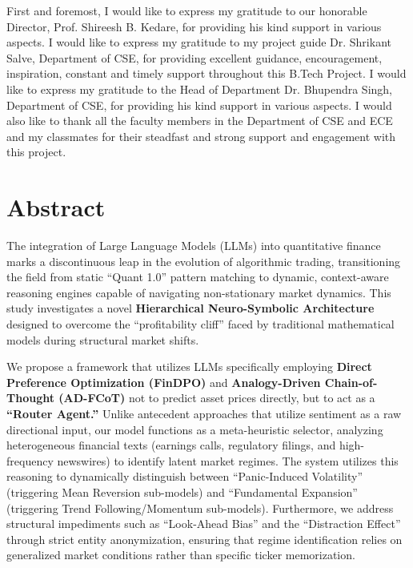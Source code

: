 \documentclass[12pt, a4paper]{report}
\begin{document}
First and foremost, I would like to express my gratitude to our honorable Director, Prof. Shireesh B. Kedare, for providing his kind support in various aspects. I would like to express my gratitude to my project guide Dr. Shrikant Salve, Department of CSE, for providing excellent guidance, encouragement, inspiration, constant and timely support throughout this B.Tech Project. I would like to express my gratitude to the Head of Department Dr. Bhupendra Singh, Department of CSE, for providing his kind support in various aspects. I would also like to thank all the faculty members in the Department of CSE and ECE and my classmates for their steadfast and strong support and engagement with this project.


\newpage
\chapter*{Abstract}

The integration of Large Language Models (LLMs) into quantitative finance marks a discontinuous leap in the evolution of algorithmic trading, transitioning the field from static ``Quant 1.0'' pattern matching to dynamic, context-aware reasoning engines capable of navigating non-stationary market dynamics. This study investigates a novel \textbf{Hierarchical Neuro-Symbolic Architecture} designed to overcome the ``profitability cliff'' faced by traditional mathematical models during structural market shifts.

We propose a framework that utilizes LLMs specifically employing \textbf{Direct Preference Optimization (FinDPO)} and \textbf{Analogy-Driven Chain-of-Thought (AD-FCoT)} not to predict asset prices directly, but to act as a \textbf{``Router Agent.''} Unlike antecedent approaches that utilize sentiment as a raw directional input, our model functions as a meta-heuristic selector, analyzing heterogeneous financial texts (earnings calls, regulatory filings, and high-frequency newswires) to identify latent market regimes. The system utilizes this reasoning to dynamically distinguish between ``Panic-Induced Volatility'' (triggering Mean Reversion sub-models) and ``Fundamental Expansion'' (triggering Trend Following/Momentum sub-models). Furthermore, we address structural impediments such as ``Look-Ahead Bias'' and the ``Distraction Effect'' through strict entity anonymization, ensuring that regime identification relies on generalized market conditions rather than specific ticker memorization.
\end{document}
